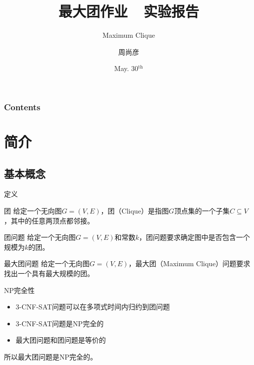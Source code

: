 \documentclass[9pt,dvipsnames,table,UTF8,aspectratio=169]{beamer}
\begin{document}

\AtBeginSubsection[]
{
	\begin{frame}[shrink]
		\tableofcontents[sectionstyle=show/shaded, subsectionstyle=show/shaded/hide]
	\end{frame}
}

\title{最大团作业~~实验报告}
\subtitle{Maximum Clique}
\author{周尚彦}
\date{May. 30$^{\text{th}}$}

\maketitle

\begin{frame}
	\frametitle{Contents}
	
	\tableofcontents[hideallsubsections]
\end{frame}

\section{简介}
\subsection{基本概念}
\begin{frame}{定义}
\begin{definition}{团}
	给定一个无向图$G = (V,E)$，团（Clique）是指图$G$顶点集的一个子集$C \subseteq V$，其中的任意两顶点都邻接。
\end{definition}

\begin{definition}{团问题}
	给定一个无向图$G = (V, E)$和常数$k$，团问题要求确定图中是否包含一个规模为$k$的团。
\end{definition}

\begin{definition}{最大团问题}
	给定一个无向图$G = (V, E)$，最大团（Maximum Clique）问题要求找出一个具有最大规模的团。
\end{definition}
\end{frame}

\begin{frame}{NP完全性}
	\begin{itemize}
		\item 3-CNF-SAT问题可以在多项式时间内归约到团问题
		\item 3-CNF-SAT问题是NP完全的
		\item 最大团问题和团问题是等价的
	\end{itemize}

	所以最大团问题是NP完全的。
\end{frame}
\end{document}
